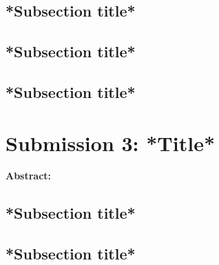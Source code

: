 \documentclass[a4paper, 11pt]{article}
\begin{document}
\subsection{*Subsection title*}




\vspace{0.5cm}
\subsection{*Subsection title*}




\vspace{0.5cm}
\subsection{*Subsection title*}







\newpage
\section{Submission 3: *Title* }

\textbf{Abstract: }




\vspace{0.5cm}
\subsection{*Subsection title*}




\vspace{0.5cm}
\subsection{*Subsection title*}
\end{document}
